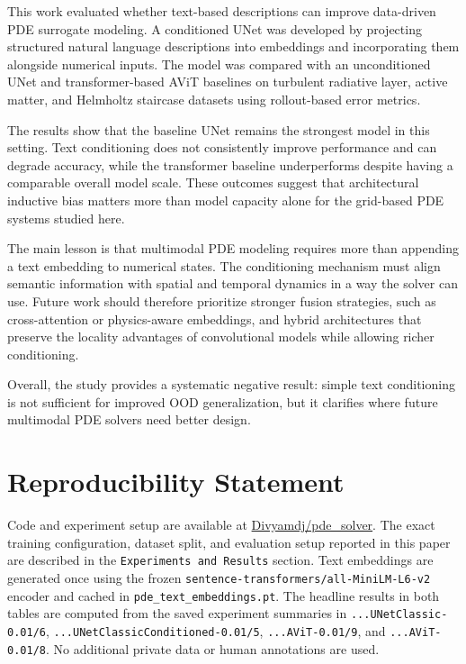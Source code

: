 \documentclass[
]{article}
\begin{document}
This work evaluated whether text-based descriptions can improve
data-driven PDE surrogate modeling. A conditioned UNet was developed by
projecting structured natural language descriptions into embeddings and
incorporating them alongside numerical inputs. The model was compared
with an unconditioned UNet and transformer-based AViT baselines on
turbulent radiative layer, active matter, and Helmholtz staircase
datasets using rollout-based error metrics.

The results show that the baseline UNet remains the strongest model in
this setting. Text conditioning does not consistently improve
performance and can degrade accuracy, while the transformer baseline
underperforms despite having a comparable overall model scale. These
outcomes suggest that architectural inductive bias matters more than
model capacity alone for the grid-based PDE systems studied here.

The main lesson is that multimodal PDE modeling requires more than
appending a text embedding to numerical states. The conditioning
mechanism must align semantic information with spatial and temporal
dynamics in a way the solver can use. Future work should therefore
prioritize stronger fusion strategies, such as cross-attention or
physics-aware embeddings, and hybrid architectures that preserve the
locality advantages of convolutional models while allowing richer
conditioning.

Overall, the study provides a systematic negative result: simple text
conditioning is not sufficient for improved OOD generalization, but it
clarifies where future multimodal PDE solvers need better design.

\section{Reproducibility Statement}\label{reproducibility-statement}

Code and experiment setup are available at
\href{https://github.com/Divyamdj/pde_solver/tree/well_updated}{Divyamdj/pde\_solver}.
The exact training configuration, dataset split, and evaluation setup
reported in this paper are described in the
\texttt{Experiments\ and\ Results} section. Text embeddings are
generated once using the frozen
\texttt{sentence-transformers/all-MiniLM-L6-v2} encoder and cached in
\texttt{pde\_text\_embeddings.pt}. The headline results in both tables
are computed from the saved experiment summaries in
\texttt{...UNetClassic-0.01/6},
\texttt{...UNetClassicConditioned-0.01/5}, \texttt{...AViT-0.01/9}, and
\texttt{...AViT-0.01/8}. No additional private data or human annotations
are used.



\end{document}
